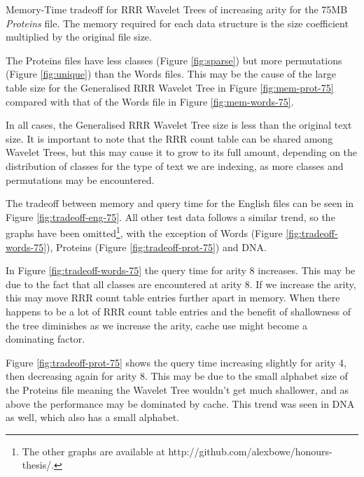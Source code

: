 			{Memory-Time tradeoff for RRR Wavelet Trees of increasing arity for
			the 75MB \emph{Proteins} file. The memory required for each data 
			structure is the size coefficient 
			multiplied by the original file size.}
		
The Proteins files have less classes (Figure \ref{fig:sparse}) but more 
permutations (Figure \ref{fig:unique}) than the Words files. This may be the 
cause of the large table size for the Generalised RRR Wavelet Tree in Figure
\ref{fig:mem-prot-75} compared with that of the Words file in Figure 
\ref{fig:mem-words-75}.

In all cases, the Generalised RRR Wavelet Tree size is less than the original
text size. It is important to note that the RRR count table can be shared among
Wavelet Trees, but this may cause it to grow to its full amount, depending on
the distribution of classes for the type of text we are indexing, as more 
classes and permutations may be encountered.

The tradeoff between memory and query time for the English files can be seen in 
Figure \ref{fig:tradeoff-eng-75}. All other test data follows a similar trend, 
so the graphs have been omitted\footnote{The 
other graphs are available at http://github.com/alexbowe/honours-thesis/.}, with the exception of Words (Figure 
\ref{fig:tradeoff-words-75}), Proteins (Figure \ref{fig:tradeoff-prot-75}) and
DNA.

In Figure \ref{fig:tradeoff-words-75} the query time for arity 8 increases. This 
may be due to the fact that all classes are encountered at arity 8. If we 
increase the arity, this may move RRR count table entries further apart in 
memory. When there happens to be a lot of RRR count table entries and the 
benefit of shallowness of the tree diminishes as we increase the arity, cache 
use might become a dominating factor.

Figure \ref{fig:tradeoff-prot-75} shows the query time increasing slightly for 
arity 4, then decreasing again for arity 8. This may be due to the small 
alphabet size
of the Proteins file meaning the Wavelet Tree wouldn't get much shallower, and
as above the performance may be dominated by cache. This trend was seen in DNA 
as well, which also has a small alphabet.
